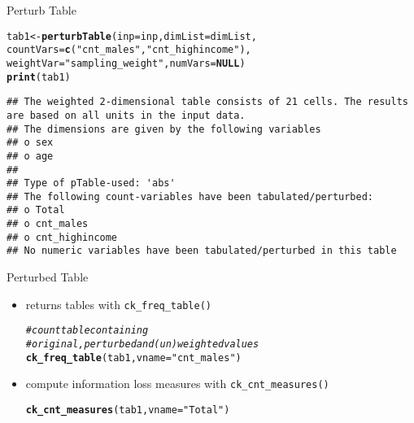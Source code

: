 \documentclass{beamer}\usepackage[]{graphicx}\usepackage[]{color}
\makeatletter
\newcommand{\hlstr}[1]{\textcolor[rgb]{0.192,0.494,0.8}{#1}}%
\newcommand{\hlcom}[1]{\textcolor[rgb]{0.678,0.584,0.686}{\textit{#1}}}%
\newcommand{\hlstd}[1]{\textcolor[rgb]{0.345,0.345,0.345}{#1}}%
\newcommand{\hlkwa}[1]{\textcolor[rgb]{0.161,0.373,0.58}{\textbf{#1}}}%
\newcommand{\hlkwb}[1]{\textcolor[rgb]{0.69,0.353,0.396}{#1}}%
\newcommand{\hlkwc}[1]{\textcolor[rgb]{0.333,0.667,0.333}{#1}}%
\newcommand{\hlkwd}[1]{\textcolor[rgb]{0.737,0.353,0.396}{\textbf{#1}}}%
\newenvironment{kframe}{%
 \def\at@end@of@kframe{}%
 \ifinner\ifhmode%
  \def\at@end@of@kframe{\end{minipage}}%
  \begin{minipage}{\columnwidth}%
 \fi\fi%
 \def\FrameCommand##1{\hskip\@totalleftmargin \hskip-\fboxsep
 \colorbox{shadecolor}{##1}\hskip-\fboxsep
     \hskip-\linewidth \hskip-\@totalleftmargin \hskip\columnwidth}%
 \MakeFramed {\advance\hsize-\width
   \@totalleftmargin\z@ \linewidth\hsize
   \@setminipage}}%
 {\par\unskip\endMakeFramed%
 \at@end@of@kframe}
\newenvironment{knitrout}{}{} %
\makeatother
\begin{document}
\begin{frame}[fragile]{Perturb Table}
\begin{knitrout}\footnotesize
{}\color{fgcolor}\begin{kframe}
\begin{alltt}
\hlstd{tab1} \hlkwb{<-} \hlkwd{perturbTable}\hlstd{(}\hlkwc{inp}\hlstd{=inp,} \hlkwc{dimList}\hlstd{=dimList,}
                     \hlkwc{countVars}\hlstd{=}\hlkwd{c}\hlstd{(}\hlstr{"cnt_males"}\hlstd{,} \hlstr{"cnt_highincome"}\hlstd{),}
  \hlkwc{weightVar}\hlstd{=}\hlstr{"sampling_weight"}\hlstd{,} \hlkwc{numVars}\hlstd{=}\hlkwa{NULL}\hlstd{)}
\hlkwd{print}\hlstd{(tab1)}
\end{alltt}
\begin{verbatim}
## The weighted 2-dimensional table consists of 21 cells. The results are based on all units in the input data. 
## The dimensions are given by the following variables
## o sex
## o age 
## 
## Type of pTable-used: 'abs' 
## The following count-variables have been tabulated/perturbed:
## o Total
## o cnt_males
## o cnt_highincome 
## No numeric variables have been tabulated/perturbed in this table
\end{verbatim}
\end{kframe}
\end{knitrout}
\end{frame}

\begin{frame}[fragile]{Perturbed Table}
  \begin{itemize}
    \item returns tables with \texttt{ck\_freq\_table()} 
\begin{knitrout}\footnotesize
{}\color{fgcolor}\begin{kframe}
\begin{alltt}
 \hlcom{# count table containing}
 \hlcom{# original, perturbed and (un)weighted values}
 \hlkwd{ck_freq_table}\hlstd{(tab1,} \hlkwc{vname}\hlstd{=}\hlstr{"cnt_males"}\hlstd{)}
\end{alltt}
\end{kframe}
\end{knitrout}

    \item compute information loss measures with \texttt{ck\_cnt\_measures()}
\begin{knitrout}\footnotesize
{}\color{fgcolor}\begin{kframe}
\begin{alltt}
\hlkwd{ck_cnt_measures}\hlstd{(tab1,} \hlkwc{vname}\hlstd{=}\hlstr{"Total"}\hlstd{)}
\end{alltt}
\end{kframe}
\end{knitrout}
  \end{itemize}
\end{frame}
\end{document}
